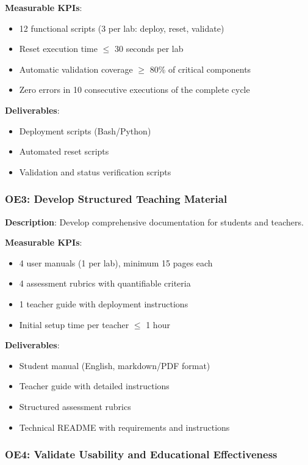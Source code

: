 \textbf{Measurable KPIs}:
\begin{itemize}
\item 12 functional scripts (3 per lab: deploy, reset, validate)
\item Reset execution time $\leq$ 30 seconds per lab
\item Automatic validation coverage $\geq$ 80\% of critical components
\item Zero errors in 10 consecutive executions of the complete cycle
\end{itemize}

\textbf{Deliverables}:
\begin{itemize}
\item Deployment scripts (Bash/Python)
\item Automated reset scripts
\item Validation and status verification scripts
\end{itemize}

\subsubsection{OE3: Develop Structured Teaching Material}

\textbf{Description}: Develop comprehensive documentation for students and teachers.

\textbf{Measurable KPIs}:
\begin{itemize}
\item 4 user manuals (1 per lab), minimum 15 pages each
\item 4 assessment rubrics with quantifiable criteria
\item 1 teacher guide with deployment instructions
\item Initial setup time per teacher $\leq$ 1 hour
\end{itemize}

\textbf{Deliverables}:
\begin{itemize}
\item Student manual (English, markdown/PDF format)
\item Teacher guide with detailed instructions
\item Structured assessment rubrics
\item Technical README with requirements and instructions
\end{itemize}

\subsubsection{OE4: Validate Usability and Educational Effectiveness}

